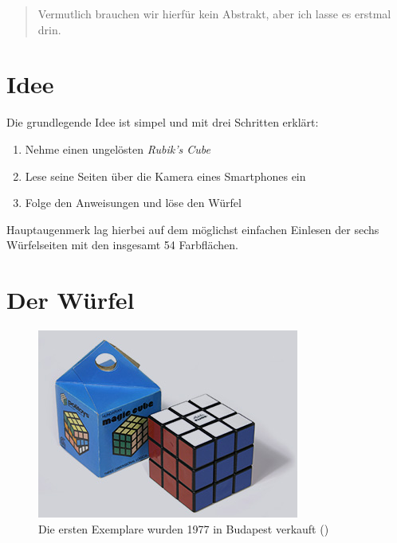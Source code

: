 



\thispagestyle{empty}				%

\printtitle									%
  	\vfill
\printauthor								%
\newpage

\begin{abstract}
Vermutlich brauchen wir hierfür kein Abstrakt, aber ich lasse es erstmal drin.
\end{abstract}

\tableofcontents
\newpage

\section{Idee}  %
Die grundlegende Idee ist simpel und mit drei Schritten erklärt:

\begin{enumerate}

  \item Nehme einen ungelösten \emph{Rubik's Cube}

  \item Lese seine Seiten über die Kamera eines Smartphones ein

  \item Folge den Anweisungen und löse den Würfel

\end{enumerate}

Hauptaugenmerk lag hierbei auf dem möglichst einfachen Einlesen der sechs
Würfelseiten mit den insgesamt 54 Farbflächen.

\section{Der Würfel}  %

\begin{figure}[ht!]
  \centering
  \includegraphics[width=\textwidth]{pics/rubikcube1977.jpg}
  \caption{Die ersten Exemplare wurden 1977 in Budapest verkauft
  (\cite{rubik:history})}
  \label{fig:rubik1977}
\end{figure}

